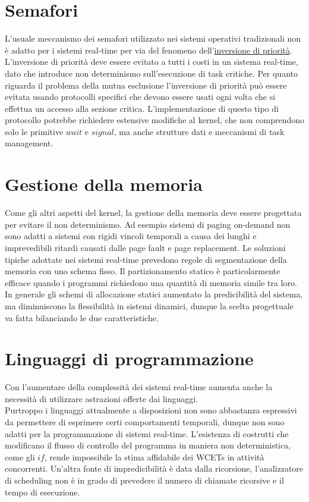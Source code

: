 \documentclass[12pt,openany,onesided]{book}
\begin{document}
\section{Semafori}
L'usuale meccanismo dei semafori utilizzato nei sistemi operativi tradizionali non è adatto per i sistemi real-time per via del fenomeno dell'\href{https://en.wikipedia.org/wiki/Priority_inversion}{inversione di priorità}.
L'inversione di priorità deve essere evitato a tutti i costi in un sistema real-time, dato che introduce non determinismo sull'esecuzione di task critiche.
Per quanto riguarda il problema della mutua esclusione l'inversione di priorità può essere evitata usando protocolli specifici che devono essere usati ogni 
volta che si effettua un accesso alla sezione critica.
L'implementazione di questo tipo di protocollo potrebbe richiedere estensive modifiche al kernel, che non comprendono solo le primitive $wait$ e $signal$, ma anche strutture dati e meccanismi di task management.
\section{Gestione della memoria}
Come gli altri aspetti del kernel, la gestione della memoria deve essere progettata per evitare il non determinismo.
Ad esempio sistemi di paging on-demand non sono adatti a sistemi con rigidi vincoli temporali a causa dei lunghi e imprevedibili ritardi causati dalle page fault e page replacement.
Le soluzioni tipiche adottate nei sistemi real-time prevedono regole di segmentazione della memoria con uno schema fisso. Il partizionamento statico è particolarmente efficace quando i programmi richiedono
una quantità di memoria simile tra loro.
In generale gli schemi di allocazione statici aumentato la predicibilità del sistema, ma diminuiscono la flessibilità in sistemi dinamici, dunque la scelta progettuale va fatta bilanciando le due caratteristiche.
\section{Linguaggi di programmazione}
Con l'aumentare della complessità dei sistemi real-time aumenta anche la necessità di utilizzare astrazioni offerte dai linguaggi.
\\
Purtroppo i linguaggi attualmente a disposizioni non sono abbastanza espressivi da permettere di esprimere certi comportamenti temporali, dunque non sono adatti per la programmazione di sistemi real-time.
L'esistenza di costrutti che modificano il flusso di controllo del programma in maniera non deterministica, come gli $if$, rende impossibile la stima affidabile dei WCETs in attività concorrenti.
Un'altra fonte di impredicibilità è data dalla ricorsione, l'analizzatore di scheduling non è in grado di prevedere il numero di chiamate ricorsive e il tempo di esecuzione.
\end{document}
